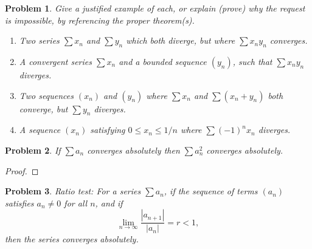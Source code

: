 \documentclass[12pt]{article}
\newtheorem{problem}{Problem}
\begin{document}
\begin{problem} %
Give a justified example of each, or explain (prove) why the request is impossible, by referencing the proper theorem(s).

\renewcommand{\labelenumi}{(\alph{enumi})}
\begin{enumerate}
\item Two series $\sum x_n$ and $\sum y_n$ which both diverge, but where $\sum x_n y_n$ converges.


\item A convergent series $\sum x_n$ and a bounded sequence $(y_n)$, such that $\sum x_n y_n$ diverges.


\item Two sequences $(x_n)$ and $(y_n)$ where $\sum x_n$ and $\sum (x_n+y_n)$ both converge, but $\sum y_n$ diverges.


\item A sequence $(x_n)$ satisfying $0\le x_n \le 1/n$ where $\sum (-1)^n x_n$ diverges.


\end{enumerate}
\end{problem}


\begin{problem} %
If $\sum a_n$ converges absolutely then $\sum a_n^2$ converges absolutely.
\end{problem}

\begin{proof}
\end{proof}


\begin{problem} %
Ratio test:  For a series $\sum a_n$, if the sequence of terms $(a_n)$ satisfies $a_n\ne 0$ for all $n$, and if
	$$\lim_{n\to\infty} \frac{|a_{n+1}|}{|a_n|} = r < 1,$$
then the series converges absolutely.
\end{problem}

\end{document}
